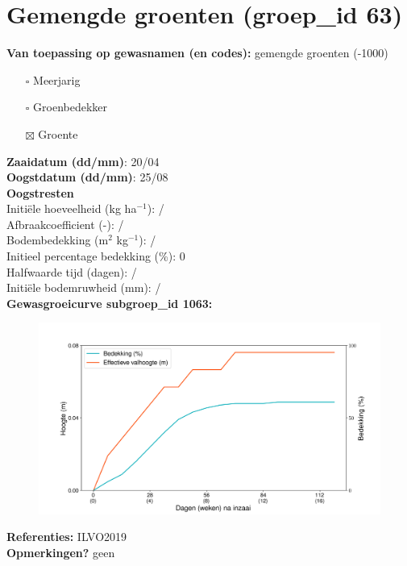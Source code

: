 \documentclass{article}
\begin{document}
 \section{Gemengde groenten (groep\_id 63)} 
 \textbf{Van toepassing op gewasnamen (en codes):} gemengde groenten (-1000) 
 \begin{multicols}{3} \begin{itemize} \item[$\square$] Meerjarig \item[$\square$] Groenbedekker \item[$\boxtimes$] Groente \end{itemize} \end{multicols} 
  \textbf{Zaaidatum (dd/mm)}: 20/04  \vspace{0.10cm} \\ 
  \textbf{Oogstdatum (dd/mm)}: 25/08  \vspace{0.10cm} \\ 
  \textbf{Oogstresten} \vspace{0.05cm} \\ 
  \tab Initi\"{e}le hoeveelheid (kg ha$^{-1}$): / \vspace{0.05cm} \\ 
  \tab Afbraakcoefficient (-): / \vspace{0.05cm} \\ 
  \tab Bodembedekking (m$^2$ kg$^{-1}$): / \vspace{0.05cm} \\ 
  \tab Initieel percentage bedekking (\%): 0 \vspace{0.05cm} \\ 
  \tab Halfwaarde tijd (dagen): / \vspace{0.05cm} \\ 
  \tab Initi\"{e}le bodemruwheid (mm): / \vspace{0.05cm} \\ 
  \textbf{Gewasgroeicurve subgroep\_id 1063:} 
 \begin{center} \begin{figure}[H] \includegraphics[width=12.5cm]{temp/1063.png} \end{figure} \end{center} 
  \textbf{Referenties:} ILVO2019 \vspace{0.10cm} \\ 
  \textbf{Opmerkingen?} geen \vspace{0.10cm} \\ 
 \newpage 
 
\end{document}
